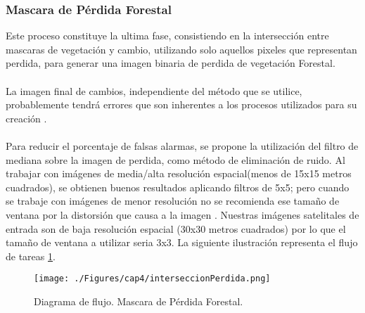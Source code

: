 \subsubsection{Mascara de P\'erdida Forestal}
Este proceso constituye la ultima fase, consistiendo en la intersecci\'on entre mascaras de vegetaci\'on y cambio, utilizando solo aquellos pixeles que representan perdida, para generar una imagen binaria de perdida de vegetaci\'on Forestal.\\~\\
La imagen final de cambios, independiente del método que se utilice, probablemente tendrá errores que son inherentes a los procesos utilizados para su creación \cite{lovell2001filtering}. \\~\\
Para reducir el porcentaje de falsas alarmas, se propone la utilización del filtro de mediana sobre la imagen de perdida, como m\'etodo de eliminación de ruido. Al trabajar con im\'agenes de media/alta resoluci\'on espacial(menos de 15x15 metros cuadrados), se obtienen buenos resultados aplicando filtros de 5x5; pero cuando se trabaje con im\'agenes de menor resoluci\'on no se recomienda ese tama\~{n}o de ventana por la distorsi\'on que causa a la imagen \cite{martinez2013normalizacion}. Nuestras im\'agenes satelitales de entrada son de baja resoluci\'on espacial (30x30 metros cuadrados) por lo que el tama\~{n}o de ventana a utilizar seria 3x3.
La siguiente ilustraci\'on representa el flujo de tareas \ref{fig:intersPerdida}.
\begin{figure}[H]
	\centering
	\texttt{[image: ./Figures/cap4/interseccionPerdida.png]}
	\caption{Diagrama de flujo. Mascara de P\'erdida Forestal.}
	\label{fig:intersPerdida}
\end{figure}

